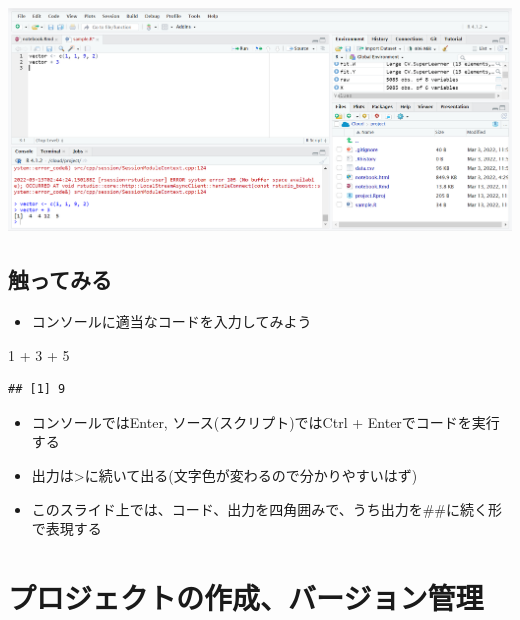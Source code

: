 \documentclass[
]{ltjsarticle}
\newenvironment{Shaded}{\begin{snugshade}}{\end{snugshade}}
\newcommand{\DecValTok}[1]{\textcolor[rgb]{0.00,0.00,0.81}{#1}}
\newcommand{\SpecialCharTok}[1]{\textcolor[rgb]{0.00,0.00,0.00}{#1}}
\providecommand{\tightlist}{%
  \setlength{\itemsep}{0pt}\setlength{\parskip}{0pt}}
\begin{document}
\begin{center}\includegraphics[width=0.77\linewidth]{figs/rstudio_appearance} \end{center}

\hypertarget{ux89e6ux3063ux3066ux307fux308b}{%
\subsection{触ってみる}\label{ux89e6ux3063ux3066ux307fux308b}}

\begin{itemize}
\tightlist
\item
  コンソールに適当なコードを入力してみよう
\end{itemize}

\begin{Shaded}
\begin{Highlighting}[]
\DecValTok{1} \SpecialCharTok{+} \DecValTok{3} \SpecialCharTok{+} \DecValTok{5}
\end{Highlighting}
\end{Shaded}

\begin{verbatim}
## [1] 9
\end{verbatim}

\begin{itemize}
\tightlist
\item
  コンソールではEnter, ソース(スクリプト)ではCtrl +
  Enterでコードを実行する
\item
  出力は\textgreater に続いて出る(文字色が変わるので分かりやすいはず)
\item
  このスライド上では、コード、出力を四角囲みで、うち出力を\#\#に続く形で表現する
\end{itemize}

\hypertarget{ux30d7ux30edux30b8ux30a7ux30afux30c8ux306eux4f5cux6210ux30d0ux30fcux30b8ux30e7ux30f3ux7ba1ux7406}{%
\section{プロジェクトの作成、バージョン管理}\label{ux30d7ux30edux30b8ux30a7ux30afux30c8ux306eux4f5cux6210ux30d0ux30fcux30b8ux30e7ux30f3ux7ba1ux7406}}
\end{document}
